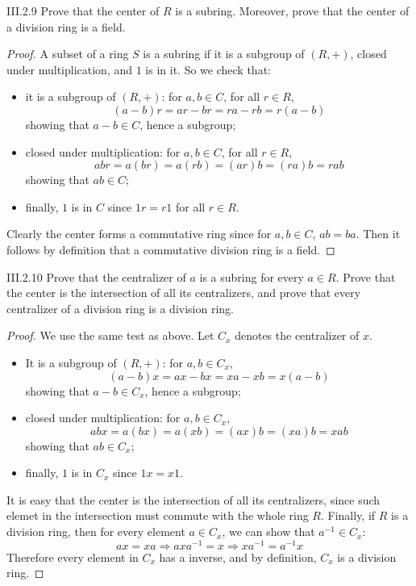 \begin{problem}{III.2.9}
Prove that the center of $R$ is a subring. Moreover, prove that the center of a division ring is a field.
\end{problem}
\begin{proof}
A subset of a ring $S$ is a subring if it is a subgroup of $(R,+)$, closed under multiplication, and $1$ is in it. So we check that:
\begin{itemize}
\setlength\itemsep{0pt}
\item it is a subgroup of $(R,+)$: for $a,b \in C$, for all $r \in R$,
\[
(a-b)r = ar - br = ra - rb = r(a-b)
\]
showing that $a-b \in C$, hence a subgroup;
\item closed under multiplication: for $a,b \in C$, for all $r \in R$,
\[
abr = a(br) = a(rb) = (ar)b = (ra)b = rab
\]
showing that $ab \in C$;
\item finally, $1$ is in $C$ since $1r = r1$ for all $r \in R$.
\end{itemize}


Clearly the center forms a commutative ring since for $a,b \in C$, $ab = ba$. Then it follows by definition that a commutative division ring is a field.
\end{proof}

\begin{problem}{III.2.10}
Prove that the centralizer of $a$ is a subring for every $a \in R$. Prove that the center is the intersection of all its centralizers, and prove that every centralizer of a division ring is a division ring.
\end{problem}
\begin{proof}
We use the same test as above. Let $C_x$ denotes the centralizer of $x$.
\begin{itemize}
\setlength\itemsep{0pt}
\item It is a subgroup of $(R,+)$: for $a,b \in C_x$,
\[
(a-b)x = ax - bx = xa - xb = x(a-b)
\]
showing that $a-b \in C_x$, hence a subgroup;
\item closed under multiplication: for $a,b \in C_x$,
\[
abx = a(bx) = a(xb) = (ax)b = (xa)b = xab
\]
showing that $ab \in C_x$;
\item finally, $1$ is in $C_x$ since $1x = x1$.
\end{itemize}
It is easy that the center is the intersection of all its centralizers, since such elemet in the intersection must commute with the whole ring $R$. Finally, if $R$ is a division ring, then for every element $a \in C_x$, we can show that $a^{-1} \in C_x$:
\[
ax = xa \Rightarrow axa^{-1} = x \Rightarrow xa^{-1} = a^{-1}x
\]
Therefore every element in $C_x$ has a inverse, and by definition, $C_x$ is a division ring.
\end{proof}

